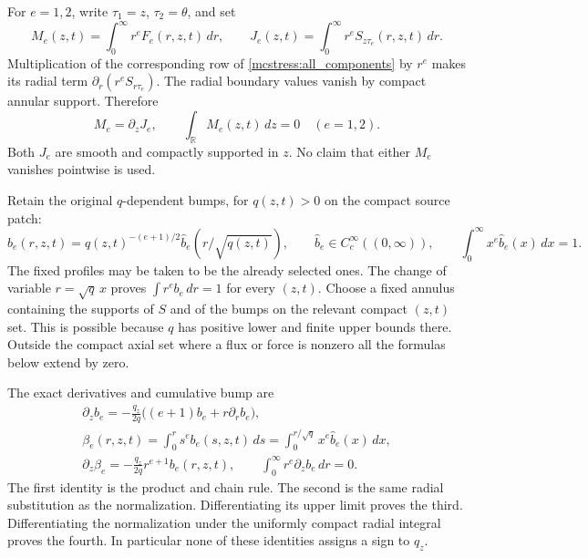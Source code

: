 \documentclass[11pt]{article}
\begin{document}
For $e=1,2$, write $\tau_1=z$, $\tau_2=\theta$, and set
\begin{equation}\label{mcstress:fluxes}
 M_e(z,t)=\int_0^\infty r^eF_e(r,z,t)\,dr,
 \qquad
 J_e(z,t)=\int_0^\infty r^eS_{z\tau_e}(r,z,t)\,dr.
\end{equation}
Multiplication of the corresponding row of
\eqref{mcstress:all_components} by $r^e$ makes its radial term
$\partial_r(r^e S_{r\tau_e})$. The radial boundary values vanish
by compact annular support. Therefore
\begin{equation}\label{mcstress:flux_identity}
 M_e=\partial_zJ_e,\qquad
 \int_{\mathbb R}M_e(z,t)\,dz=0\quad(e=1,2).
\end{equation}
Both $J_e$ are smooth and compactly supported in $z$. No claim that
either $M_e$ vanishes pointwise is used.

Retain the original $q$-dependent bumps, for $q(z,t)>0$ on the compact
source patch:
\begin{equation}\label{mcstress:bumps}
 b_e(r,z,t)=q(z,t)^{-(e+1)/2}
             \widehat b_e(r/\sqrt{q(z,t)}),\qquad
 \widehat b_e\in C_c^\infty((0,\infty)),\qquad
 \int_0^\infty x^e\widehat b_e(x)\,dx=1.
\end{equation}
The fixed profiles may be taken to be the already selected ones.
The change of variable $r=\sqrt q\,x$ proves
$\int r^e b_e\,dr=1$ for every $(z,t)$. Choose a fixed annulus
containing the supports of $S$ and of the bumps on the relevant compact
$(z,t)$ set. This is possible because $q$ has positive lower and finite
upper bounds there. Outside the compact axial set where a flux or
force is nonzero all the formulas below extend by zero.

The exact derivatives and cumulative bump are
\begin{equation}\label{mcstress:bump_derivatives}
\begin{gathered}
 \partial_zb_e=-\frac{q_z}{2q}
                  \bigl((e+1)b_e+r\partial_rb_e\bigr),\\
 \beta_e(r,z,t)=\int_0^r s^eb_e(s,z,t)\,ds
              =\int_0^{r/\sqrt q}x^e\widehat b_e(x)\,dx,\\
 \partial_z\beta_e=-\frac{q_z}{2q}r^{e+1}b_e(r,z,t),\qquad
 \int_0^\infty r^e\partial_zb_e\,dr=0.
\end{gathered}
\end{equation}
The first identity is the product and chain rule. The second is the
same radial substitution as the normalization. Differentiating its
upper limit proves the third. Differentiating the normalization under
the uniformly compact radial integral proves the fourth. In particular
none of these identities assigns a sign to $q_z$.
\end{document}
